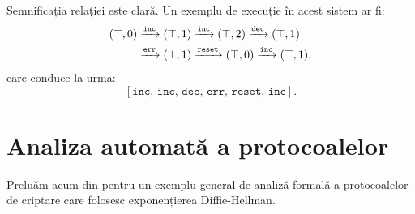 Semnificația relației este clară. Un exemplu de execuție în acest sistem
ar fi:
\begin{align*}
  (\top, 0) &\xrar{\texttt{inc}} (\top, 1) \xrar{\texttt{inc}} (\top, 2) %
              \xrar{\texttt{dec}} (\top, 1) \\
            &\xrar{\texttt{err}} (\bot, 1) \xrar{\texttt{reset}} (\top, 0) %
              \xrar{\texttt{inc}} (\top, 1),
\end{align*}
care conduce la urma:
\[
  \left[ \texttt{inc, inc, dec, err, reset, inc} \right].
\]


\section{Analiza automată a protocoalelor}

Preluăm acum din \cite[Cap.\ 3]{schmidt} pentru un exemplu general de
analiză formală a protocoalelor de criptare care folosesc exponențierea
Diffie-Hellman.




